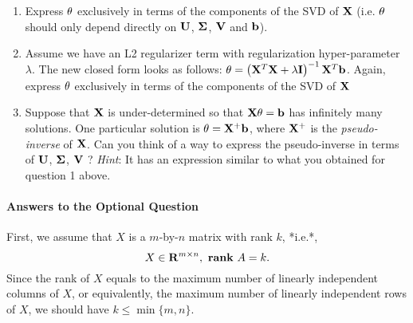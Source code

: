 \begin{enumerate}
\item Express $\bf{\theta}$ exclusively in terms of the components of the SVD of $\bf{X}$ (i.e. $\bf{\theta}$ should only depend directly on $\bf{U}$, $\bf{\Sigma}$, $\bf{V}$ and $\bf{b}$).
\item Assume we have an L2 regularizer term with regularization hyper-parameter $\lambda$. The new closed form looks as follows: ${\bf{\theta}} = \left({\bf{X}}^T {\bf{X}} + \lambda {\bf{I}}\right)^{-1}{\bf{X}}^T {\bf{b}}$. Again, express $\bf{\theta}$ exclusively in terms of the components of the SVD of $\bf{X}$
\item Suppose that $\bf{X}$ is under-determined so that $\bf{X} \bf{\theta} = \bf{b}$ has infinitely many solutions. One particular solution is ${\bf{\theta}} = {\bf{X}}^{+} {\bf{b}}$, where ${\bf{X}}^{+}$ is the \emph{pseudo-inverse} of ${\bf{X}}$. Can you think of a way to express the pseudo-inverse in terms of $\bf{U}$, $\bf{\Sigma}$, $\bf{V}$ ? \emph{Hint}: It has an expression similar to what you obtained for question 1 above.
\end{enumerate}







\paragraph{Answers to the Optional Question}

\iffalse
\begin{equation}
\newcommand{\reals}{\mathbf{R}}
\newcommand{\rank}{\mathbf{rank}}$
\newcommand{\diag}{\mathbf{diag}}
\newcommand{\range}{\mathcal{R}}
\end{equation}
\fi

\newcommand{\V}{\hat{V}}
\newcommand{\U}{\hat{U}}
\newcommand{\Sig}{\hat{\Sigma}}

First, we assume that $X$ is a $m$-by-$n$ matrix with rank $k$, *i.e.*,
\begin{equation}
X\in\reals^{m\times n},\
\rank\ A = k.
\end{equation}
Since the rank of $X$ equals to the maximum number of linearly independent columns of $X$, or equivalently, the maximum number of linearly independent rows of $X$, we should have $k\leq\min\{m,n\}$.

